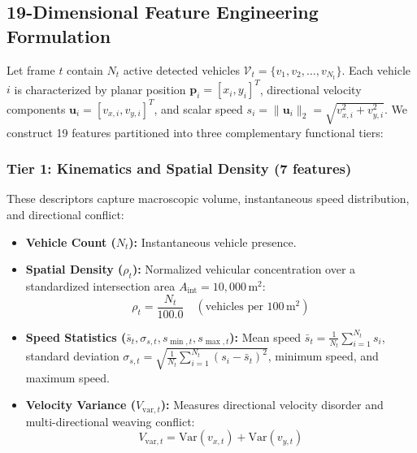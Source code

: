 \documentclass[conference]{IEEEtran}
\begin{document}
\subsection{19-Dimensional Feature Engineering Formulation}
Let frame $t$ contain $N_t$ active detected vehicles $\mathcal{V}_t = \{v_1, v_2, \dots, v_{N_t}\}$. Each vehicle $i$ is characterized by planar position $\mathbf{p}_i = [x_i, y_i]^T$, directional velocity components $\mathbf{u}_i = [v_{x,i}, v_{y,i}]^T$, and scalar speed $s_i = \|\mathbf{u}_i\|_2 = \sqrt{v_{x,i}^2 + v_{y,i}^2}$. We construct 19 features partitioned into three complementary functional tiers:

\subsubsection{Tier 1: Kinematics and Spatial Density (7 features)}
These descriptors capture macroscopic volume, instantaneous speed distribution, and directional conflict:
\begin{itemize}
    \item \textbf{Vehicle Count ($N_t$):} Instantaneous vehicle presence.
    \item \textbf{Spatial Density ($\rho_t$):} Normalized vehicular concentration over a standardized intersection area $A_{\text{int}} = 10,000\,\text{m}^2$:
    \begin{equation}
        \rho_t = \frac{N_t}{100.0} \quad (\text{vehicles per } 100\,\text{m}^2)
    \end{equation}
    \item \textbf{Speed Statistics ($\bar{s}_t, \sigma_{s,t}, s_{\min, t}, s_{\max, t}$):} Mean speed $\bar{s}_t = \frac{1}{N_t}\sum_{i=1}^{N_t} s_i$, standard deviation $\sigma_{s,t} = \sqrt{\frac{1}{N_t}\sum_{i=1}^{N_t} (s_i - \bar{s}_t)^2}$, minimum speed, and maximum speed.
    \item \textbf{Velocity Variance ($V_{\text{var}, t}$):} Measures directional velocity disorder and multi-directional weaving conflict:
    \begin{equation}
        V_{\text{var}, t} = \text{Var}(v_{x, t}) + \text{Var}(v_{y, t})
    \end{equation}
\end{itemize}
\end{document}
